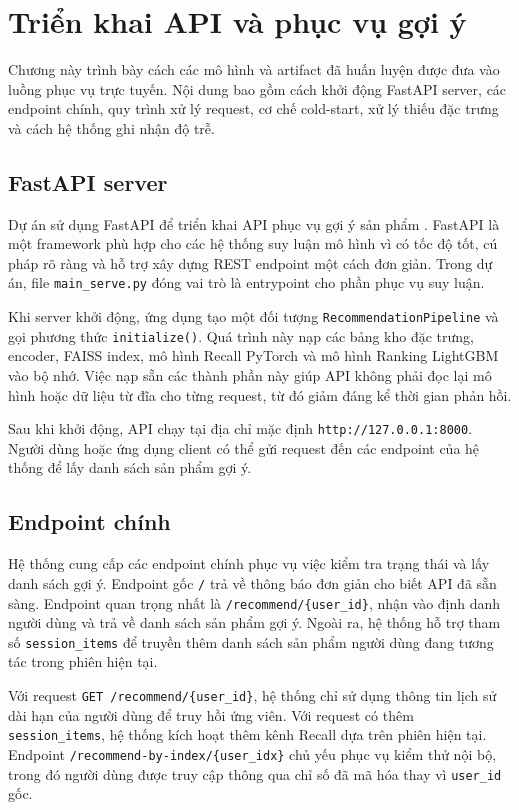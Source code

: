 ﻿\chapter{Triển khai API và phục vụ gợi ý}

Chương này trình bày cách các mô hình và artifact đã huấn luyện được đưa vào luồng phục vụ trực tuyến. Nội dung bao gồm cách khởi động FastAPI server, các endpoint chính, quy trình xử lý request, cơ chế cold-start, xử lý thiếu đặc trưng và cách hệ thống ghi nhận độ trễ.

\section{FastAPI server}
Dự án sử dụng FastAPI để triển khai API phục vụ gợi ý sản phẩm \cite{fastapi2026docs}. FastAPI là một framework phù hợp cho các hệ thống suy luận mô hình vì có tốc độ tốt, cú pháp rõ ràng và hỗ trợ xây dựng REST endpoint một cách đơn giản. Trong dự án, file \texttt{main\_serve.py} đóng vai trò là entrypoint cho phần phục vụ suy luận.
\medskip

Khi server khởi động, ứng dụng tạo một đối tượng \texttt{RecommendationPipeline} và gọi phương thức \texttt{initialize()}. Quá trình này nạp các bảng kho đặc trưng, encoder, FAISS index, mô hình Recall PyTorch và mô hình Ranking LightGBM vào bộ nhớ. Việc nạp sẵn các thành phần này giúp API không phải đọc lại mô hình hoặc dữ liệu từ đĩa cho từng request, từ đó giảm đáng kể thời gian phản hồi.
\medskip

Sau khi khởi động, API chạy tại địa chỉ mặc định \texttt{http://127.0.0.1:8000}. Người dùng hoặc ứng dụng client có thể gửi request đến các endpoint của hệ thống để lấy danh sách sản phẩm gợi ý.

\section{Endpoint chính}
Hệ thống cung cấp các endpoint chính phục vụ việc kiểm tra trạng thái và lấy danh sách gợi ý. Endpoint gốc \texttt{/} trả về thông báo đơn giản cho biết API đã sẵn sàng. Endpoint quan trọng nhất là \texttt{/recommend/\{user\_id\}}, nhận vào định danh người dùng và trả về danh sách sản phẩm gợi ý. Ngoài ra, hệ thống hỗ trợ tham số \texttt{session\_items} để truyền thêm danh sách sản phẩm người dùng đang tương tác trong phiên hiện tại.
\medskip

Với request \texttt{GET /recommend/\{user\_id\}}, hệ thống chỉ sử dụng thông tin lịch sử dài hạn của người dùng để truy hồi ứng viên. Với request có thêm \texttt{session\_items}, hệ thống kích hoạt thêm kênh Recall dựa trên phiên hiện tại. Endpoint \texttt{/recommend-by-index/}\allowbreak\texttt{\{user\_idx\}} chủ yếu phục vụ kiểm thử nội bộ, trong đó người dùng được truy cập thông qua chỉ số đã mã hóa thay vì \texttt{user\_id} gốc.

